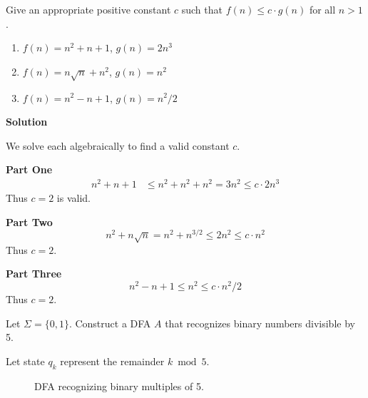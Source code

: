 \begin{homeworkProblem}
    Give an appropriate positive constant \(c\) such that \(f(n) \leq c \cdot g(n)\) for all \(n > 1\).

    \begin{enumerate}
        \item \(f(n) = n^2 + n + 1\), \(g(n) = 2n^3\)
        \item \(f(n) = n\sqrt{n} + n^2\), \(g(n) = n^2\)
        \item \(f(n) = n^2 - n + 1\), \(g(n) = n^2 / 2\)
    \end{enumerate}

    \textbf{Solution}

    We solve each algebraically to find a valid constant \(c\).

    \textbf{Part One}
    \[
        \begin{split}
            n^2 + n + 1 &\leq n^2 + n^2 + n^2 = 3n^2 \leq c \cdot 2n^3
        \end{split}
    \]
    Thus \(c = 2\) is valid.

    \textbf{Part Two}
    \[
        n^2 + n\sqrt{n} = n^2 + n^{3/2} \leq 2n^2 \leq c \cdot n^2
    \]
    Thus \(c = 2\).

    \textbf{Part Three}
    \[
        n^2 - n + 1 \leq n^2 \leq c \cdot n^2/2
    \]
    Thus \(c = 2\).
\end{homeworkProblem}

\pagebreak

\begin{homeworkProblem}
    Let \(\Sigma = \{0, 1\}\). Construct a DFA \(A\) that recognizes binary numbers divisible by 5.

    Let state \(q_k\) represent the remainder \(k \bmod 5\).

    \begin{figure}[h]
        \centering
        \caption{DFA recognizing binary multiples of 5.}
        \label{fig:multiple5}
    \end{figure}
\end{homeworkProblem}

